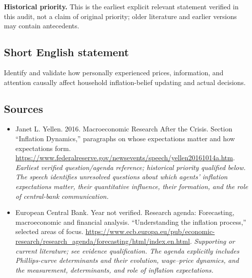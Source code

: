 \documentclass[11pt]{article}
\begin{document}
\par\textbf{Historical priority.} This is the earliest explicit relevant statement verified in this audit, not a claim of original priority; older literature and earlier versions may contain antecedents.

\subsection{Short English statement}
Identify and validate how personally experienced prices, information, and attention causally affect household inflation-belief updating and actual decisions.

\subsection{Sources}
\begin{itemize}\raggedright
\item[\textnormal{[S1]}]\hypertarget{source:30007524:1}{} Janet L. Yellen. 2016. Macroeconomic Research After the Crisis. Section “Inflation Dynamics,” paragraphs on whose expectations matter and how expectations form.
\url{https://www.federalreserve.gov/newsevents/speech/yellen20161014a.htm}.
{\small\textit{Earliest verified question/agenda reference; historical priority qualified below. The speech identifies unresolved questions about which agents’ inflation expectations matter, their quantitative influence, their formation, and the role of central-bank communication.}}

\item[\textnormal{[S2]}]\hypertarget{source:30007524:2}{} European Central Bank. Year not verified. Research agenda: Forecasting, macroeconomic and financial analysis. “Understanding the inflation process,” selected areas of focus.
\url{https://www.ecb.europa.eu/pub/economic-research/research_agenda/forecasting/html/index.en.html}.
{\small\textit{Supporting or current literature; see evidence qualification. The agenda explicitly includes Phillips-curve determinants and their evolution, wage–price dynamics, and the measurement, determinants, and role of inflation expectations.}}
\end{itemize}
\end{document}
